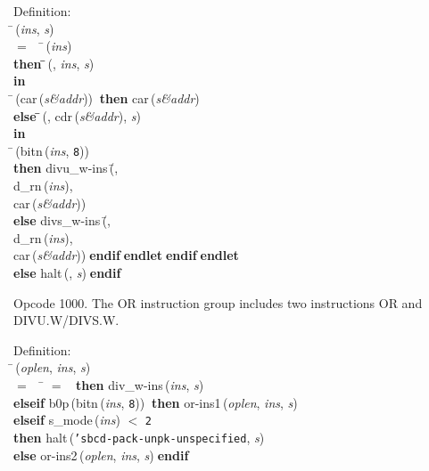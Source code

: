 \begin{tabbing}{\sc Definition}: \\  
\=\,({\it{ins\/}}, {\it{s\/}}) \\ 
$=$$\;\;\;\;$\=\,({\it{ins\/}}) \\ 
{\bf then }\=\=\,({}, {\it{ins\/}}, {\it{s\/}})\- \\ 
{\bf in} \\ 
\=\,({\rm{car}}\,({\it{s\&addr\/}}))$\;\;${\bf then }{\rm{car}}\,({\it{s\&addr\/}}) \\ 
{\bf else }\=\=\,({}, {\rm{cdr}}\,({\it{s\&addr\/}}), {\it{s\/}})\- \\ 
{\bf in} \\ 
\=\,({\rm{bitn}}\,({\it{ins\/}}, {\tt{8}})) \\ 
{\bf then }{\rm{divu\_w-ins}}\,(\=, \\ 
{\rm{d\_rn}}\,({\it{ins\/}}), \\ 
{\rm{car}}\,({\it{s\&addr\/}}))\- \\ 
{\bf else }{\rm{divs\_w-ins}}\,(\=, \\ 
{\rm{d\_rn}}\,({\it{ins\/}}), \\ 
{\rm{car}}\,({\it{s\&addr\/}}))\-$\;${\bf  endif}\-$\;${\bf  endlet}\-$\;${\bf  endif}\-$\;${\bf  endlet}\- \\ 
{\bf else }{\rm{halt}}\,({}, {\it{s\/}})$\;${\bf  endif}\-\-
\end{tabbing}

 Opcode 1000.
 The OR instruction group includes two instructions OR and DIVU.W/DIVS.W.
\begin{tabbing}{\sc Definition}: \\  
\=\,({\it{oplen\/}}, {\it{ins\/}}, {\it{s\/}}) \\ 
$=$$\;\;\;\;$\= $=$ {}$\;\;${\bf then }{\rm{div\_w-ins}}\,({\it{ins\/}}, {\it{s\/}}) \\ 
{\bf elseif }{\rm{b0p}}\,({\rm{bitn}}\,({\it{ins\/}}, {\tt{8}}))$\;\;${\bf then }{\rm{or-ins1}}\,({\it{oplen\/}}, {\it{ins\/}}, {\it{s\/}}) \\ 
{\bf elseif }{\rm{s\_mode}}\,({\it{ins\/}}) $<$ {\tt{2}} \\ 
{\bf then }{\rm{halt}}\,({\tt{'}}{\tt{sbcd-pack-unpk-unspecified}}, {\it{s\/}}) \\ 
{\bf else }{\rm{or-ins2}}\,({\it{oplen\/}}, {\it{ins\/}}, {\it{s\/}})$\;${\bf  endif}\-\-
\end{tabbing}

